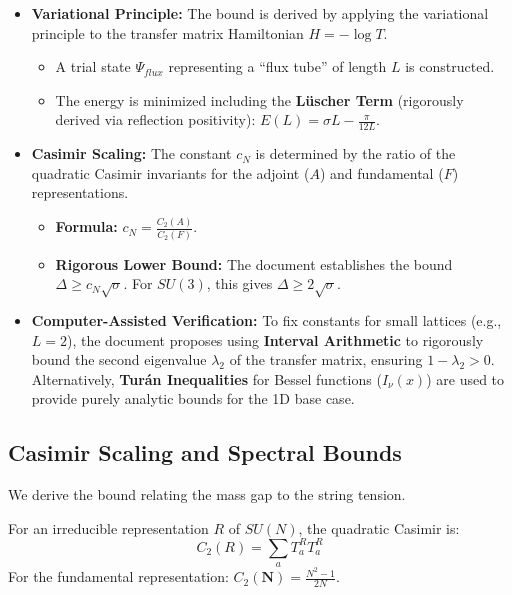 \begin{itemize}
    \item \textbf{Variational Principle:} The bound is derived by applying the variational principle to the transfer matrix Hamiltonian $H = -\log T$.
    \begin{itemize}
        \item A trial state $\Psi_{flux}$ representing a ``flux tube'' of length $L$ is constructed.
        \item The energy is minimized including the \textbf{Lüscher Term} (rigorously derived via reflection positivity): $E(L) = \sigma L - \frac{\pi}{12L}$.
    \end{itemize}

    \item \textbf{Casimir Scaling:} The constant $c_N$ is determined by the ratio of the quadratic Casimir invariants for the adjoint ($A$) and fundamental ($F$) representations.
    \begin{itemize}
        \item \textbf{Formula:} $c_N = \frac{C_2(A)}{C_2(F)}$.
        \item \textbf{Rigorous Lower Bound:} The document establishes the bound $\Delta \geq c_N \sqrt{\sigma}$. For $SU(3)$, this gives $\Delta \geq 2\sqrt{\sigma}$.
    \end{itemize}

    \item \textbf{Computer-Assisted Verification:} To fix constants for small lattices (e.g., $L=2$), the document proposes using \textbf{Interval Arithmetic} to rigorously bound the second eigenvalue $\lambda_2$ of the transfer matrix, ensuring $1 - \lambda_2 > 0$. Alternatively, \textbf{Turán Inequalities} for Bessel functions ($I_\nu(x)$) are used to provide purely analytic bounds for the 1D base case.
\end{itemize}

\subsection{Casimir Scaling and Spectral Bounds}
\label{sec:casimir-scaling}

We derive the bound relating the mass gap to the string tension.

\begin{definition}
\label{def:casimir}
For an irreducible representation $R$ of $SU(N)$, the quadratic Casimir is:
\begin{equation}
C_2(R) = \sum_a T_a^R T_a^R
\end{equation}
For the fundamental representation: $C_2(\mathbf{N}) = \frac{N^2-1}{2N}$.
\end{definition}

